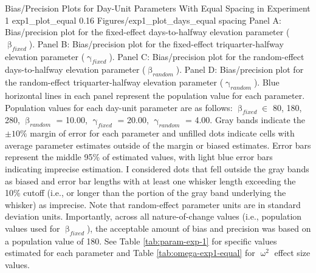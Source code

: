 \documentclass[
12pt, %
twoside,
english]{guelphthesis}
\begin{document}
\begin{apaFigure}
[portrait]
[samepage]
[0cm]
{Bias/Precision Plots for Day-Unit Parameters With Equal Spacing in Experiment 1}
{exp1_plot_equal}
{0.16}
{Figures/exp1_plot_days_equal spacing}
{Panel A: Bias/precision plot for the fixed-effect days-to-halfway elevation parameter ($\upbeta_{fixed}$). Panel B: Bias/precision plot for the fixed-effect triquarter-halfway elevation parameter ($\upgamma_{fixed}$). Panel C: Bias/precision plot for the random-effect days-to-halfway elevation parameter ($\upbeta_{random}$). Panel D: Bias/precision plot for the random-effect triquarter-halfway elevation parameter ($\upgamma_{random}$). Blue horizontal lines in each panel represent the population value for each parameter. Population values for each day-unit parameter are as follows: $\upbeta_{fixed} \in$ {80, 180, 280}, $\upbeta_{random}$ = 10.00, $\upgamma_{fixed}$ = 20.00, $\upgamma_{random}$ = 4.00. Gray bands indicate the $\pm 10\%$ margin of error for each parameter and unfilled dots indicate cells with average parameter estimates outside of the margin or biased estimates. Error bars represent the middle 95\% of estimated values, with light blue error bars indicating imprecise estimation. I considered dots that fell outside the gray bands as biased and error bar lengths with at least one whisker length exceeding the 10\% cutoff (i.e., or longer than the portion of the gray band underlying the whisker) as imprecise. Note that random-effect parameter units are in standard deviation units. Importantly, across all nature-of-change values (i.e., population values used for $\upbeta_{fixed}$), the acceptable amount of bias and precision was based on a population value of 180. See Table \ref{tab:param-exp-1} for specific values estimated for each parameter and Table \ref{tab:omega-exp1-equal} for $\upomega^2$ effect size values.}
\end{apaFigure}
\end{document}
